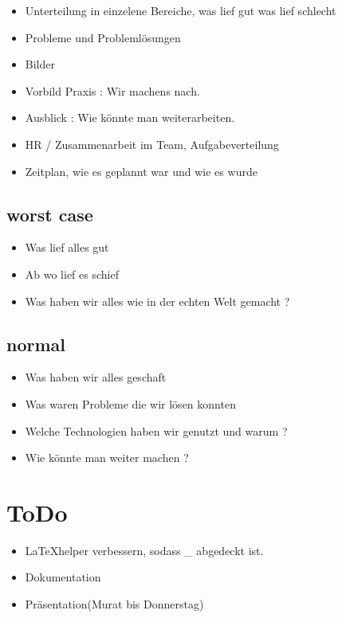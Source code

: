 \documentclass{article}
\begin{document}
\begin{itemize}

\item Unterteilung in einzelene Bereiche, was lief gut was lief schlecht

\item Probleme und Problemlösungen

\item Bilder

\item Vorbild Praxis : Wir machens nach.

\item Ausblick : Wie könnte man weiterarbeiten.

\item HR / Zusammenarbeit im Team, Aufgabeverteilung

\item Zeitplan, wie es geplannt war und wie es wurde

\end{itemize}

\subsection{worst case}

\begin{itemize}

\item Was lief alles gut

\item Ab wo lief es schief

\item Was haben wir alles wie in der echten Welt gemacht ?

\end{itemize}

\subsection{normal}

\begin{itemize}

\item Was haben wir alles geschaft

\item Was waren Probleme die wir lösen konnten

\item Welche Technologien haben wir genutzt und warum ?

\item Wie könnte man weiter machen ?

\end{itemize}

\section{ToDo}

\begin{itemize}

\item \LaTeX helper verbessern, sodass \_ abgedeckt ist.

\item Dokumentation 

\item Pr\"{a}sentation(Murat bis Donnerstag)

\end{itemize}
\end{document}

